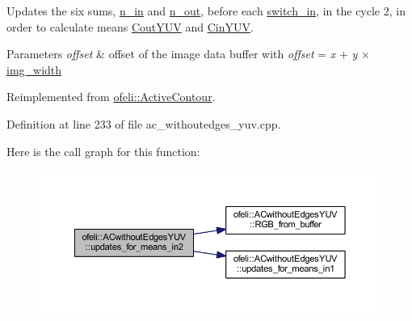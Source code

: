 Updates the six sums, \hyperlink{classofeli_1_1_a_cwithout_edges_y_u_v_a63542bb13e9dd879714b6c71cd5fe62c}{n\-\_\-in} and \hyperlink{classofeli_1_1_a_cwithout_edges_y_u_v_a034adbc67a268bd84539fe8e76b9deec}{n\-\_\-out}, before each \hyperlink{classofeli_1_1_active_contour_a7d9a557b580af708155ff4ab8bbfd73b}{switch\-\_\-in}, in the cycle 2, in order to calculate means \hyperlink{classofeli_1_1_a_cwithout_edges_y_u_v_a1aea515bf36ea9f426cc653802252ce5}{Cout\-Y\-U\-V} and \hyperlink{classofeli_1_1_a_cwithout_edges_y_u_v_ac5976def2629d484df763de752bb165d}{Cin\-Y\-U\-V}. 


\begin{DoxyParams}{Parameters}
{\em offset} & offset of the image data buffer with {\itshape offset} = {\itshape x} + {\itshape y} × \hyperlink{classofeli_1_1_active_contour_a3623de7ebc0d27ba7fac21a5929afbc6}{img\-\_\-width} \\
\hline
\end{DoxyParams}


Reimplemented from \hyperlink{classofeli_1_1_active_contour_a77e9dc7bcbd0ba48499a499891e021cb}{ofeli\-::\-Active\-Contour}.



Definition at line 233 of file ac\-\_\-withoutedges\-\_\-yuv.\-cpp.



Here is the call graph for this function\-:\nopagebreak
\begin{figure}[H]
\begin{center}
\leavevmode
\includegraphics[width=350pt]{classofeli_1_1_a_cwithout_edges_y_u_v_a249aa0e9664cf4f024997ac4475fe70c_cgraph}
\end{center}
\end{figure}


